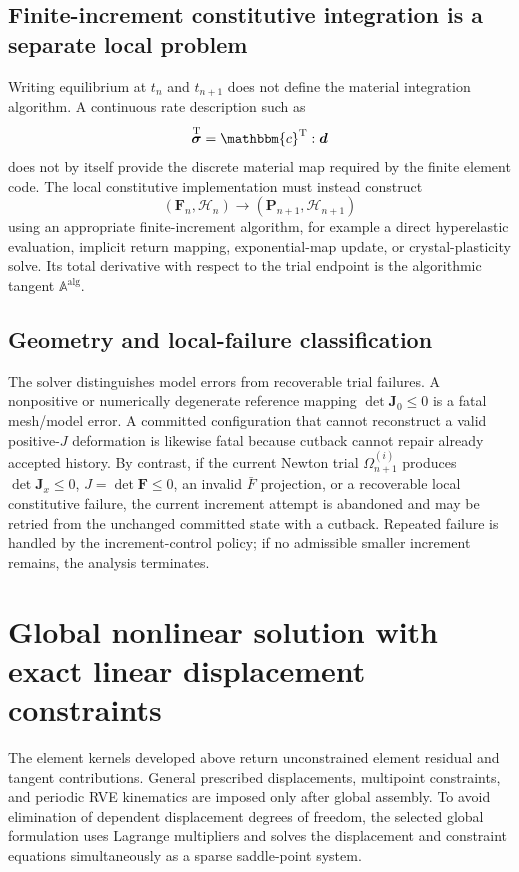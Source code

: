 \documentclass[11pt,a4paper]{article}
\newcommand{\bs}[1]{\boldsymbol{#1}}
\newcommand{\F}{\bs{F}}
\newcommand{\Pstress}{\bs{P}}
\newcommand{\sig}{\bs{\sigma}}
\newcommand{\dten}{\bs{d}}
\newcommand{\Aalg}{\mathbb{A}^{\mathrm{alg}}}
\newcommand{\cT}{\mathbbm{c}^{\mathrm{T}}}
\newcommand{\vct}[1]{\mathbf{#1}}
\begin{document}
\subsection{Finite-increment constitutive integration is a separate local problem}

Writing equilibrium at $t_n$ and $t_{n+1}$ does not define the material integration algorithm. A continuous rate description such as
\begin{equation}
\overset{\mathrm T}{\sig}=\cT:\dten
\end{equation}
does not by itself provide the discrete material map required by the finite element code. The local constitutive implementation must instead construct
\begin{equation}
(\F_n,\mathcal H_n)
\longrightarrow
(\Pstress_{n+1},\mathcal H_{n+1})
\end{equation}
using an appropriate finite-increment algorithm, for example a direct hyperelastic evaluation, implicit return mapping, exponential-map update, or crystal-plasticity solve. Its total derivative with respect to the trial endpoint is the algorithmic tangent $\Aalg$.


\subsection{Geometry and local-failure classification}

The solver distinguishes model errors from recoverable trial failures. A nonpositive or numerically degenerate reference mapping $\det\vct J_0\le0$ is a fatal mesh/model error. A committed configuration that cannot reconstruct a valid positive-$J$ deformation is likewise fatal because cutback cannot repair already accepted history. By contrast, if the current Newton trial $\Omega_{n+1}^{(i)}$ produces $\det\vct J_x\le0$, $J=\det\F\le0$, an invalid $\bar F$ projection, or a recoverable local constitutive failure, the current increment attempt is abandoned and may be retried from the unchanged committed state with a cutback. Repeated failure is handled by the increment-control policy; if no admissible smaller increment remains, the analysis terminates.

\section{Global nonlinear solution with exact linear displacement constraints}
\label{sec:global-kkt}

The element kernels developed above return unconstrained element residual and tangent contributions. General prescribed displacements, multipoint constraints, and periodic RVE kinematics are imposed only after global assembly. To avoid elimination of dependent displacement degrees of freedom, the selected global formulation uses Lagrange multipliers and solves the displacement and constraint equations simultaneously as a sparse saddle-point system.
\end{document}
